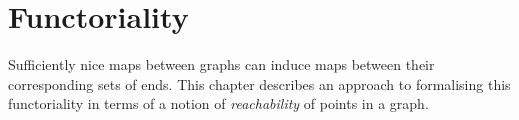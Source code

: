 \chapter{Functoriality}
\label{chap:functoriality}

Sufficiently nice maps between graphs can induce maps between their corresponding sets of ends. This chapter describes an approach to formalising this functoriality in terms of a notion of \emph{reachability} of points in a graph.
